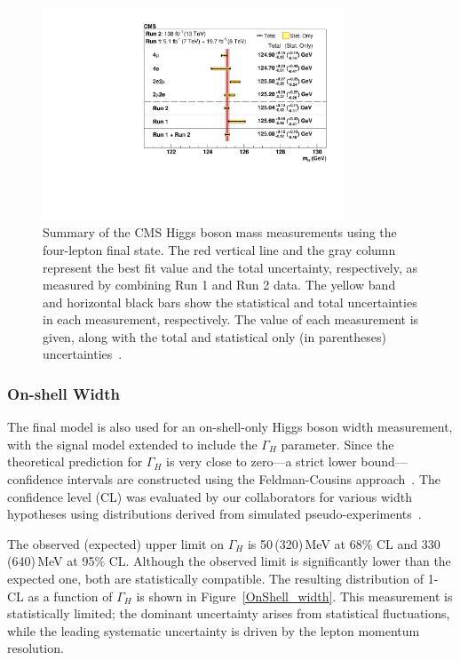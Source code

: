 \begin{figure}[!htb]
  \centering
  \includegraphics[width=0.8\textwidth]{Figure_009.pdf}
  \caption{Summary of the CMS Higgs boson mass measurements using the four-lepton final state. The red vertical line and the gray column represent the best fit value and the total uncertainty, respectively, as measured by combining Run 1 and Run 2 data. The yellow band and horizontal black bars show the statistical and total uncertainties in each measurement, respectively. The value of each measurement is given, along with the total and statistical only (in parentheses) uncertainties~\cite{PhysRevD.111.092014}.}
  \label{Run1Run2_scan}
\end{figure}

\subsubsection{On-shell Width}

The final \onshell model is also used for an on-shell-only Higgs boson width measurement, with the signal model extended to include the $\Gamma_H$ parameter. Since the theoretical prediction for $\Gamma_H$ is very close to zero---a strict lower bound---confidence intervals are constructed using the Feldman-Cousins approach~\cite{FC}. The confidence level (CL) was evaluated by our collaborators for various width hypotheses using distributions derived from simulated pseudo-experiments~\cite{PhysRevD.111.092014}.

The observed (expected) upper limit on $\Gamma_H$ is 50\,(320)\,MeV at 68\% CL and 330\,(640)\,MeV at 95\% CL. Although the observed limit is significantly lower than the expected one, both are statistically compatible. The resulting distribution of 1-CL as a function of $\Gamma_H$ is shown in Figure~\ref{OnShell_width}. This measurement is statistically limited; the dominant uncertainty arises from statistical fluctuations, while the leading systematic uncertainty is driven by the lepton momentum resolution.

